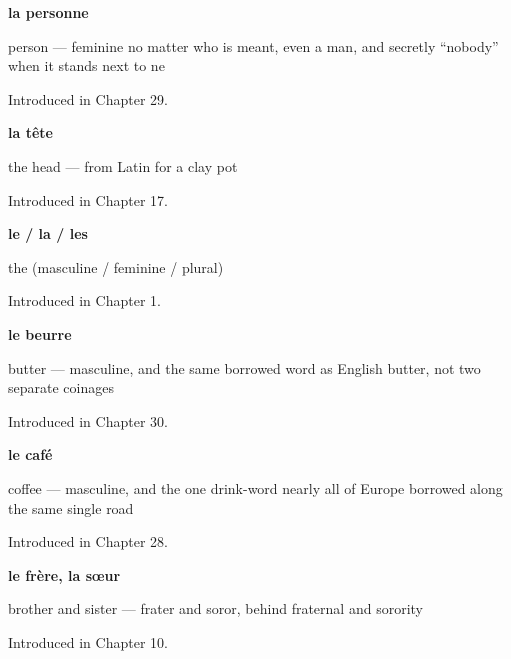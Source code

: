 \noindent\begin{minipage}[t]{\linewidth}
\raggedright
\textbf{la personne}\par
\small person — feminine no matter who is meant, even a man, and secretly \textquotedblleft{}nobody\textquotedblright{} when it stands next to ne\par
\footnotesize Introduced in Chapter 29.
\end{minipage}\par\medskip

\noindent\begin{minipage}[t]{\linewidth}
\raggedright
\textbf{la tête}\par
\small the head — from Latin for a clay pot\par
\footnotesize Introduced in Chapter 17.
\end{minipage}\par\medskip

\noindent\begin{minipage}[t]{\linewidth}
\raggedright
\textbf{le / la / les}\par
\small the (masculine / feminine / plural)\par
\footnotesize Introduced in Chapter 1.
\end{minipage}\par\medskip

\noindent\begin{minipage}[t]{\linewidth}
\raggedright
\textbf{le beurre}\par
\small butter — masculine, and the same borrowed word as English butter, not two separate coinages\par
\footnotesize Introduced in Chapter 30.
\end{minipage}\par\medskip

\noindent\begin{minipage}[t]{\linewidth}
\raggedright
\textbf{le café}\par
\small coffee — masculine, and the one drink-word nearly all of Europe borrowed along the same single road\par
\footnotesize Introduced in Chapter 28.
\end{minipage}\par\medskip

\noindent\begin{minipage}[t]{\linewidth}
\raggedright
\textbf{le frère, la sœur}\par
\small brother and sister — frater and soror, behind fraternal and sorority\par
\footnotesize Introduced in Chapter 10.
\end{minipage}\par\medskip

